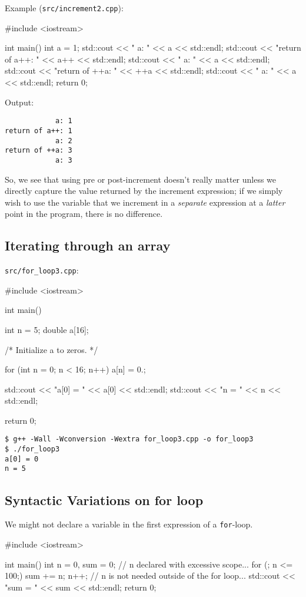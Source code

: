 \documentclass[12pt,letterpaper,twoside]{article}
\begin{document}
Example (\texttt{src/increment2.cpp}):

\begin{cpp}
#include <iostream>

int main() {
  int a = 1;
  std::cout << "            a: " << a   << std::endl;
  std::cout << "return of a++: " << a++ << std::endl;
  std::cout << "            a: " << a   << std::endl;
  std::cout << "return of ++a: " << ++a << std::endl;
  std::cout << "            a: " << a   << std::endl;
  return 0;
}
\end{cpp}

Output:

\begin{verbatim}
            a: 1
return of a++: 1
            a: 2
return of ++a: 3
            a: 3
\end{verbatim}

So, we see that using pre or post-increment doesn't really matter
unless we directly capture the value returned by the increment
expression; if we simply wish to use the variable that we increment in
a \emph{separate} expression at a \emph{latter} point in the program,
there is no difference.

\subsection{Iterating through an array}
\texttt{src/for\_loop3.cpp}:

\begin{cpp}
#include <iostream>

int main() {
  int n = 5;
  double a[16];

  /* Initialize a to zeros. */

  for (int n = 0; n < 16; n++) {
    a[n] = 0.;
  }

  std::cout << "a[0] = " << a[0] << std::endl;
  std::cout << "n = " << n << std::endl;

  return 0;
}
\end{cpp}

\begin{verbatim}
$ g++ -Wall -Wconversion -Wextra for_loop3.cpp -o for_loop3
$ ./for_loop3
a[0] = 0
n = 5
\end{verbatim}

\vspace{-3ex}
\subsection{Syntactic Variations on for loop}
\vspace{-1ex}
We might not declare a variable in the first expression of a
\texttt{for}-loop.
\begin{cpp}
#include <iostream>

int main() {
  int n = 0, sum = 0;   // n declared with excessive scope...
  for (; n <= 100;) {
    sum += n;
    n++;
  }                     // n is not needed outside of the for loop...
  std::cout << "sum = " << sum << std::endl;
  return 0;
}
\end{cpp}
\end{document}
